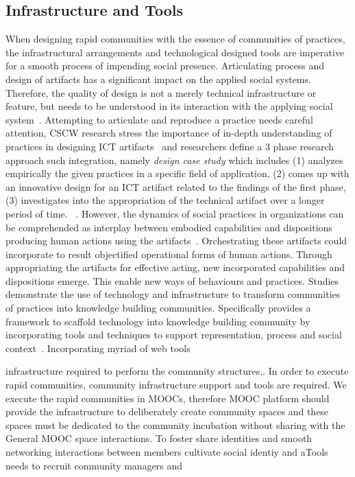 \documentclass[manuscript,screen,review]{acmart}
\begin{document}
\subsection{Infrastructure and Tools}
When designing rapid communities with the essence of communities of practices, the infrastructural arrangements and technological designed tools are imperative for a smooth process of impending social presence.  Articulating process and design of artifacts has a significant impact on the applied social systems. Therefore, the quality of design is not a merely technical infrastructure or feature, but needs to be understood in its interaction with the applying social system~\cite{rohde2009towards}. Attempting to articulate and reproduce a practice needs careful attention, CSCW research stress the importance of in-depth understanding of practices in designing ICT  artifacts~\cite{wulf1995towards} and researchers define a 3 phase research approach such integration, namely \textit{design case study} which includes (1) analyzes empirically the given practices in a specific field of application, (2) comes up with an innovative design for an ICT artifact related to the findings of the first phase, (3) investigates into the appropriation of the technical artifact over a longer period of time. ~\cite{wulf2011engaging}. However, the dynamics of social practices in organizations can be comprehended as interplay between embodied capabilities and dispositions producing  human actions using the artifacts~\cite{wulf1995towards}. Orchestrating these artifacts could incorporate to result objectified operational forms of human actions. Through appropriating the artifacts for effective acting, new incorporated capabilities and dispositions emerge. This enable new ways of behaviours and practices. Studies demonstrate the use of technology and infrastructure to transform communities of practices into knowledge building communities. Specifically provides a framework to scaffold technology into knowledge building community by incorporating tools and techniques to support representation, process and social context~\cite{hoadley2005using}. Incorporating myriad of web tools 


infrastructure required to perform  the community structures,. In order to execute rapid communities, community infrastructure support and tools are required. We execute the rapid communities in MOOCs, therefore MOOC platform should provide the infrastructure to deliberately create community spaces and these spaces must be dedicated to the community incubation without sharing with the General MOOC space interactions. To foster share identities and smooth networking interactions between members  cultivate social identiy and aTools needs to recruit community managers and 
\end{document}
